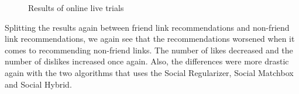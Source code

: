 \begin{figure}[h!]
\centering
{}
\caption{Results of online live trials}
\end{figure}

Splitting the results again between friend link recommendations and non-friend link recommendations, we again see that the recommendations worsened when it comes to recommending non-friend links. The number of likes decreased and the number of dislikes increased once again. Also, the differences were more drastic again with the two algorithms that uses the Social Regularizer, Social Matchbox and Social Hybrid.

